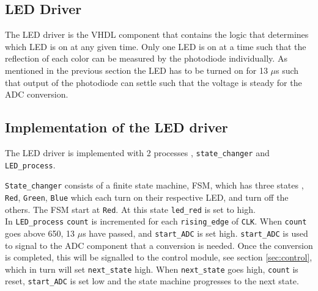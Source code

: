 \subsection{LED Driver}
The LED driver is the VHDL component that contains the logic that determines which LED is on at any given time.
Only one LED is on at a time such that the reflection of each color can be measured by the photodiode individually.
As mentioned in the previous section the LED has to be turned on for 13 $\mu$s such that output of the photodiode can settle such that the voltage is steady for the ADC conversion.
\subsection{Implementation of the LED driver}


The LED driver is implemented with 2 processes , \texttt{state\_changer} and \texttt{LED\_process}. 

\texttt{State\_changer} consists of a finite state machine, FSM, which has three states , \texttt{Red}, \texttt{Green}, \texttt{Blue} which each turn on their respective LED, and turn off the others.  The FSM start at \texttt{Red}.  At this state \texttt{led\_red} is set to high.\\


In \texttt{LED\_process} \texttt{count} is incremented for each \texttt{rising\_edge} of \texttt{CLK}.  When \texttt{count} goes above 650, 13 $\mu$s have passed, and  \texttt{start\_ADC} is set high. 
\texttt{start\_ADC} is used to signal to the ADC component that a conversion is needed.
Once the conversion is completed, this will be signalled to the control module, see section \ref{sec:control}, which in turn will set \texttt{next\_state} high.
When \texttt{next\_state} goes high, \texttt{count} is reset, \texttt{start\_ADC} is set low  and the state machine progresses to the next state.

